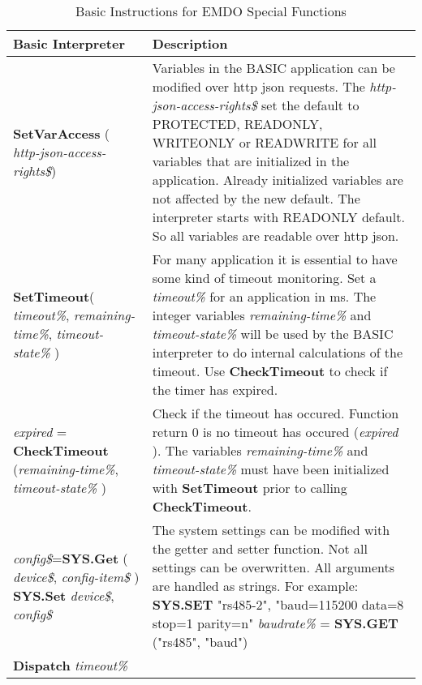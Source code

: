 \begin{table}[]
\centering
\caption{Basic Instructions for EMDO Special Functions}
\label{Basic_Instructions_for_EMDO_Special_Functions}
\begin{tabular}{|p{4cm}|p{10cm}|}
\hline
\textbf{Basic Interpreter} & \textbf{Description}                                                   
\\ \hline
\textbf{SetVarAccess} ( \textit{http-json-access-rights\$})
&
Variables in the BASIC application can be modified over http json requests. The \textit{http-json-access-rights\$} set the default to PROTECTED, READONLY, WRITEONLY or READWRITE for all variables that are initialized in the application.  Already initialized variables are not affected by the new default. The interpreter starts with READONLY default. So all variables are readable over http json. 
\\ \hline
\textbf{SetTimeout}( \textit{timeout\%}, \textit{remaining-time\%}, \textit{timeout-state\%} )
& For many application it is essential to have some kind of timeout monitoring. Set a \textit{timeout\%} for an application in ms.\newline 
The integer variables \textit{remaining-time\%} and \textit{timeout-state\%} will be used by the BASIC interpreter to do internal calculations of the timeout.\newline 
Use \textbf{CheckTimeout} to check if the timer has expired.
\\ \hline
\textit{expired} = \textbf{CheckTimeout} (\textit{remaining-time\%}, \textit{timeout-state\%} )
& Check if the timeout has occured. Function return 0 is no timeout has occured (\textit{expired} ). The variables \textit{remaining-time\%} and \textit{timeout-state\%} must have been initialized with \textbf{SetTimeout} prior to calling \textbf{CheckTimeout}.
\\ \hline
\textit{config\$}=\textbf{SYS.Get} ( \textit{device\$}, \textit{config-item\$} )\newline
\textbf{SYS.Set} \textit{device\$}, \textit{config\$}
& The system settings can be modified with the getter and setter function. Not all settings can be overwritten. All arguments are handled as strings.\newline
For example:
\textbf{SYS.SET} "rs485-2", "baud=115200 data=8 stop=1 parity=n"\newline
\textit{baudrate\%} = \textbf{SYS.GET} ("rs485", "baud")\newline
\\ \hline
\textbf{Dispatch} \textit{timeout\%}

\end{tabular}
\end{table}
